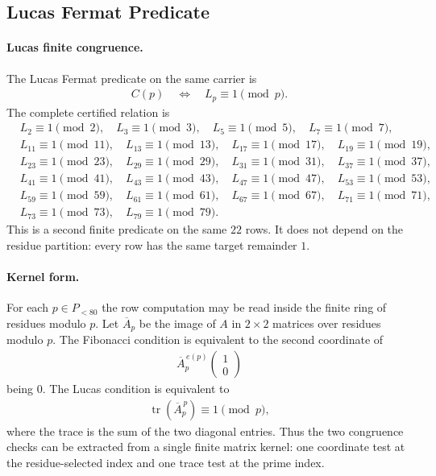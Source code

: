 \subsection{Lucas Fermat Predicate}
\label{sec:window6-lucas-fermat-predicate}

\paragraph{Lucas finite congruence.}
The Lucas Fermat predicate on the same carrier is
$$
\begin{aligned}
C(p) \quad \Longleftrightarrow \quad L_p\equiv 1\pmod p.
\end{aligned}
$$
The complete certified relation is
$$
\begin{aligned}
&L_2\equiv 1\pmod 2,\quad L_3\equiv 1\pmod 3,\quad L_5\equiv 1\pmod 5,\quad L_7\equiv 1\pmod 7,\\
&L_{11}\equiv 1\pmod {11},\quad L_{13}\equiv 1\pmod {13},\quad L_{17}\equiv 1\pmod {17},\quad L_{19}\equiv 1\pmod {19},\\
&L_{23}\equiv 1\pmod {23},\quad L_{29}\equiv 1\pmod {29},\quad L_{31}\equiv 1\pmod {31},\quad L_{37}\equiv 1\pmod {37},\\
&L_{41}\equiv 1\pmod {41},\quad L_{43}\equiv 1\pmod {43},\quad L_{47}\equiv 1\pmod {47},\quad L_{53}\equiv 1\pmod {53},\\
&L_{59}\equiv 1\pmod {59},\quad L_{61}\equiv 1\pmod {61},\quad L_{67}\equiv 1\pmod {67},\quad L_{71}\equiv 1\pmod {71},\\
&L_{73}\equiv 1\pmod {73},\quad L_{79}\equiv 1\pmod {79}.
\end{aligned}
$$
This is a second finite predicate on the same $22$ rows. It does not depend on the residue partition: every row has the same target remainder $1$.

\paragraph{Kernel form.}
For each $p\in P_{<80}$ the row computation may be read inside the finite ring of residues modulo $p$. Let $\overline A_p$ be the image of $A$ in $2\times 2$ matrices over residues modulo $p$. The Fibonacci condition is equivalent to the second coordinate of
$$
\begin{aligned}
\overline A_p^{\,e(p)}\begin{pmatrix}1\\0\end{pmatrix}
\end{aligned}
$$
being $0$. The Lucas condition is equivalent to
$$
\begin{aligned}
\operatorname{tr}(\overline A_p^{\,p})\equiv 1\pmod p,
\end{aligned}
$$
where the trace is the sum of the two diagonal entries. Thus the two congruence checks can be extracted from a single finite matrix kernel: one coordinate test at the residue-selected index and one trace test at the prime index.

